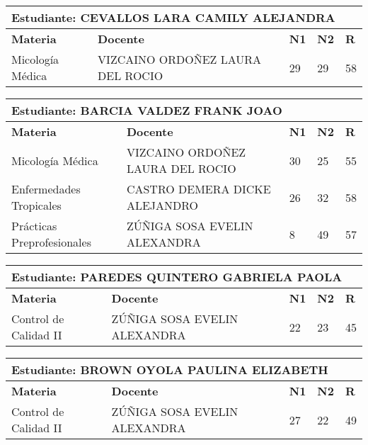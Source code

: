 \begin{tabularx}{\textwidth}{|p{5cm}|p{7cm}|X|X|X|}
\hline
\multicolumn{5}{|p{\dimexpr\textwidth-2\tabcolsep-2\arrayrulewidth}|}{\textbf{Estudiante: CEVALLOS LARA CAMILY ALEJANDRA }}\\\hline
\textbf{Materia} & \textbf{Docente} & \textbf{N1} & \textbf{N2} & \textbf{R} \\ \hline
Micología Médica & VIZCAINO ORDOÑEZ LAURA DEL ROCIO   & 29 & 29& 58 \\ \hline
\end{tabularx}\vspace{10mm}
\small
\begin{tabularx}{\textwidth}{|p{5cm}|p{7cm}|X|X|X|}
\hline
\multicolumn{5}{|p{\dimexpr\textwidth-2\tabcolsep-2\arrayrulewidth}|}{\textbf{Estudiante: BARCIA VALDEZ FRANK JOAO }}\\\hline
\textbf{Materia} & \textbf{Docente} & \textbf{N1} & \textbf{N2} & \textbf{R} \\ \hline
Micología Médica & VIZCAINO ORDOÑEZ LAURA DEL ROCIO   & 30 & 25& 55 \\ \hline
Enfermedades Tropicales & CASTRO DEMERA DICKE ALEJANDRO  & 26 & 32& 58 \\ \hline
Prácticas Preprofesionales & ZÚÑIGA SOSA EVELIN ALEXANDRA  & 8 & 49& 57 \\ \hline
\end{tabularx}\vspace{10mm}
\small
\begin{tabularx}{\textwidth}{|p{5cm}|p{7cm}|X|X|X|}
\hline
\multicolumn{5}{|p{\dimexpr\textwidth-2\tabcolsep-2\arrayrulewidth}|}{\textbf{Estudiante: PAREDES QUINTERO GABRIELA PAOLA }}\\\hline
\textbf{Materia} & \textbf{Docente} & \textbf{N1} & \textbf{N2} & \textbf{R} \\ \hline
Control de Calidad II & ZÚÑIGA SOSA EVELIN ALEXANDRA  & 22 & 23& 45 \\ \hline
\end{tabularx}\vspace{10mm}
\small
\begin{tabularx}{\textwidth}{|p{5cm}|p{7cm}|X|X|X|}
\hline
\multicolumn{5}{|p{\dimexpr\textwidth-2\tabcolsep-2\arrayrulewidth}|}{\textbf{Estudiante: BROWN OYOLA PAULINA ELIZABETH }}\\\hline
\textbf{Materia} & \textbf{Docente} & \textbf{N1} & \textbf{N2} & \textbf{R} \\ \hline
Control de Calidad II & ZÚÑIGA SOSA EVELIN ALEXANDRA  & 27 & 22& 49 \\ \hline
\end{tabularx}\vspace{10mm}
